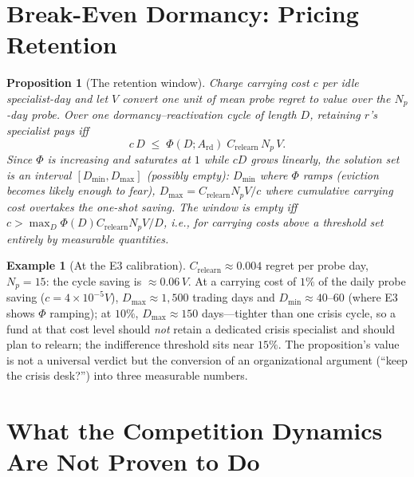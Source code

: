\documentclass[11pt,a4paper]{article}
\theoremstyle{definition}
\newtheorem{example}{Example}[section]
\theoremstyle{plain}
\newtheorem{proposition}{Proposition}[section]
\begin{document}
\section{Break-Even Dormancy: Pricing Retention}
\label{sec:dd4-breakeven}

\begin{proposition}[The retention window]
\label{prop:dd4-breakeven}
Charge carrying cost $c$ per idle specialist-day and let $V$ convert one
unit of mean probe regret to value over the $N_p$-day probe. Over one
dormancy--reactivation cycle of length $D$, retaining $r$'s specialist
pays iff
\[
  c\, D \;\le\; \Phi(D; A_{\mathrm{rd}})\;
  C_{\mathrm{relearn}}\, N_p\, V .
\]
Since $\Phi$ is increasing and saturates at $1$ while $cD$ grows
linearly, the solution set is an interval $[D_{\min}, D_{\max}]$
(possibly empty): $D_{\min}$ where $\Phi$ ramps (eviction becomes likely
enough to fear), $D_{\max} = C_{\mathrm{relearn}} N_p V / c$ where
cumulative carrying cost overtakes the one-shot saving. The window is
empty iff $c > \max_D \Phi(D) C_{\mathrm{relearn}} N_p V / D$, i.e.,
for carrying costs above a threshold set entirely by measurable
quantities.
\end{proposition}

\begin{example}[At the E3 calibration]
$C_{\mathrm{relearn}} \approx 0.004$ regret per probe day, $N_p = 15$:
the cycle saving is $\approx 0.06\, V$. At a carrying cost of $1\%$ of
the daily probe saving ($c = 4 \times 10^{-5} V$), $D_{\max} \approx
1{,}500$ trading days and $D_{\min} \approx 40$--$60$ (where E3 shows
$\Phi$ ramping); at $10\%$, $D_{\max} \approx 150$ days---tighter than
one crisis cycle, so a fund at that cost level should \emph{not} retain
a dedicated crisis specialist and should plan to relearn; the indifference
threshold sits near $15\%$. The proposition's value is not a universal
verdict but the conversion of an organizational argument
(``keep the crisis desk?'') into three measurable numbers.
\end{example}

\section{What the Competition Dynamics Are Not Proven to Do}
\label{sec:dd4-honesty}
\end{document}
